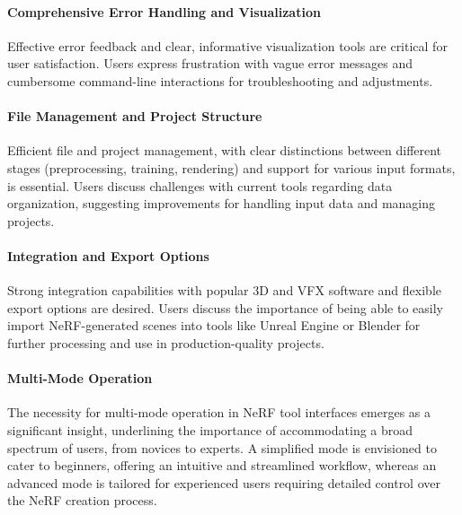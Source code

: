 \paragraph{Comprehensive Error Handling and Visualization}
Effective error feedback and clear, informative visualization tools are critical for user satisfaction. 
Users express frustration with vague error messages and cumbersome command-line interactions for troubleshooting and adjustments. 
\cite{P2, P3}

\paragraph{File Management and Project Structure}
Efficient file and project management, with clear distinctions between different stages (preprocessing, training, rendering) and support for various input formats, is essential. 
Users discuss challenges with current tools regarding data organization, suggesting improvements for handling input data and managing projects​​.
\cite{P1, P3}



\paragraph{Integration and Export Options}
Strong integration capabilities with popular 3D and VFX software and flexible export options are desired. 
Users discuss the importance of being able to easily import NeRF-generated scenes into tools like Unreal Engine or Blender for further processing and use in production-quality projects​​.
\cite{P1, P2, P4}

\paragraph{Multi-Mode Operation}
The necessity for multi-mode operation in NeRF tool interfaces emerges as a significant insight, underlining the importance of accommodating a broad spectrum of users, from novices to experts. 
A simplified mode is envisioned to cater to beginners, offering an intuitive and streamlined workflow, whereas an advanced mode is tailored for experienced users requiring detailed control over the NeRF creation process. 
\cite{P1, P2, P3, P4}

